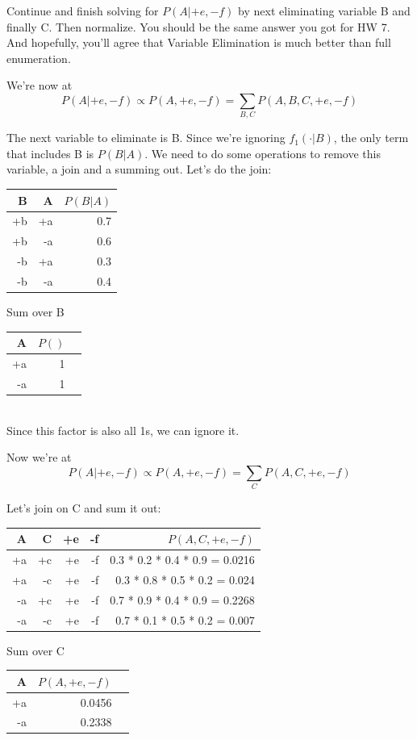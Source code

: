 \documentclass[12pt]{article}
\begin{document}
Continue and finish solving for $P(A|+e,-f)$ by next eliminating variable B and finally C. Then normalize.
You should be the same answer you got for HW 7. And hopefully, you'll agree that Variable Elimination is much better than full enumeration.

We're now at $$P(A|+e,-f) \propto P(A,+e,-f) = \sum_{B,C} P(A,B,C,+e,-f)$$

The next variable to eliminate is B. Since we're ignoring $f_1(\cdot|B)$, the only term that includes B is $P(B|A)$. We need to do some operations to remove this variable, a join and a summing out. Let's do the join:

\begin{tabular}{|r|r|r|} \hline
B  & A  & $P(B|A)$ \\ \hline
+b & +a & 0.7      \\ \hline
+b & -a & 0.6      \\ \hline
-b & +a & 0.3      \\ \hline
-b & -a & 0.4      \\ \hline
\end{tabular} Sum over B
\begin{tabular}{|r|r|r|} \hline
 A  & $P()$ \\ \hline
+a & 1      \\ \hline
-a & 1      \\ \hline
\end{tabular}\\

Since this factor is also all 1s, we can ignore it.

Now we're at$$P(A|+e,-f) \propto P(A,+e,-f) = \sum_{C} P(A,C,+e,-f)$$

Let's join on C and sum it out:

\begin{tabular}{|r|r|r|r|r|} \hline
A  & C  & +e & -f  & $P(A,C,+e,-f)$ \\ \hline
+a & +c & +e & -f & 0.3 * 0.2 * 0.4 * 0.9 = 0.0216  \\ \hline
+a & -c & +e & -f & 0.3 * 0.8 * 0.5 * 0.2 = 0.024   \\ \hline
-a & +c & +e & -f & 0.7 * 0.9 * 0.4 * 0.9 = 0.2268  \\ \hline
-a & -c & +e & -f & 0.7 * 0.1 * 0.5 * 0.2 = 0.007   \\ \hline
\end{tabular}Sum over C
\begin{tabular}{|r|r|r|} \hline
 A  & $P(A,+e,-f)$ \\ \hline
+a &  0.0456     \\ \hline
-a &  0.2338     \\ \hline
\end{tabular}\\
\end{document}
